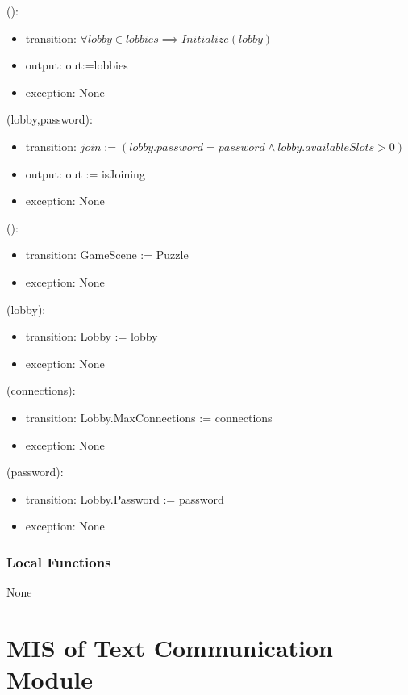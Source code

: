 \documentclass[12pt, titlepage]{article}
\begin{document}
():
\begin{itemize}
\item transition: $\forall lobby \in lobbies \implies Initialize(lobby)$
\item output: out:=lobbies
\item exception: None
\end{itemize}

(lobby,password):
\begin{itemize}
\item transition: $join := (lobby.password=password \land lobby.availableSlots>0)$
\item output: out := isJoining
\item exception: None
\end{itemize}

():
\begin{itemize}
\item transition: GameScene := Puzzle
\item exception: None
\end{itemize}

(lobby):
\begin{itemize}
\item transition: Lobby := lobby
\item exception: None
\end{itemize}

(connections):
\begin{itemize}
\item transition: Lobby.MaxConnections := connections
\item exception: None
\end{itemize}

(password):
\begin{itemize}
\item transition: Lobby.Password := password
\item exception: None 
\end{itemize}

\subsubsection{Local Functions}

None

\newpage

\section{MIS of Text Communication Module} \label{sec:text} 
\end{document}
